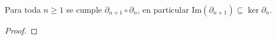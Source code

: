 \begin{ejercicio}\label{ej:62}
  Para toda $n\geq 1$ se cumple $\partial_{n+1}\circ\partial_n$, en particular
  Im$(\partial_{n+1})\subseteq\ker\partial_n$.
\end{ejercicio}
\begin{proof}%

\end{proof}%

